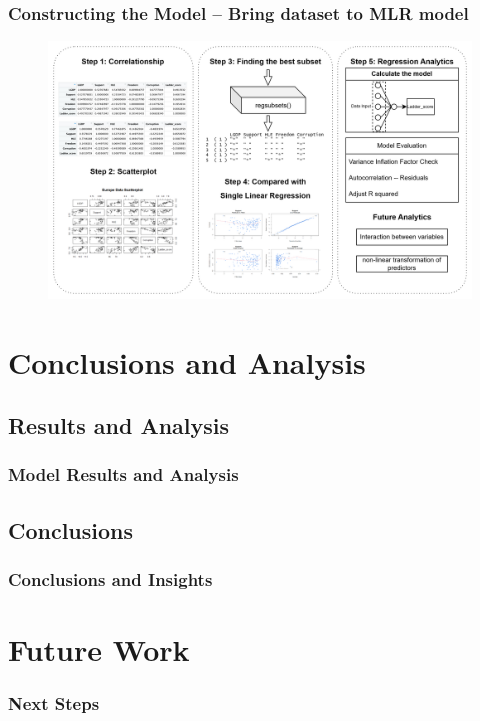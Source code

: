\documentclass{beamer}
\begin{document}
\begin{frame}
  \frametitle{Constructing the Model -- Bring dataset to MLR model}
  \begin{figure}
    \includegraphics[width=\textwidth]{img/UsingMLR.png}
  \end{figure}
\end{frame}
% 
% 
% 
% 
% 
% 
% 
% 
% 
% 
\section{Conclusions and Analysis}
% 
% 
% 
% 
\subsection{Results and Analysis}
% 
% 
% 
% 
\begin{frame}
  \frametitle{Model Results and Analysis}
\end{frame}
% 
% 
% 
% 
\subsection{Conclusions}
% 
% 
% 
% 
\begin{frame}
  \frametitle{Conclusions and Insights}
\end{frame}
% 
% 
% 
% 
% 
% 
% 
% 
% 
% 
% 
% 
\section{Future Work}
% 
% 
% 
% 
\begin{frame}
  \frametitle{Next Steps}
\end{frame}
\end{document}
